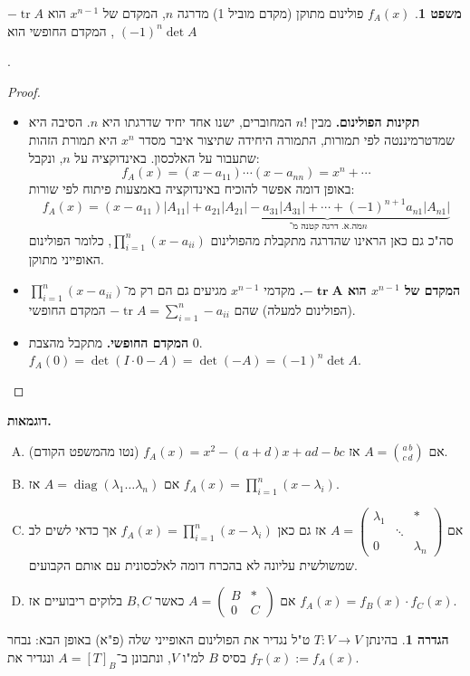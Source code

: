 \documentclass[a4paper]{article}
\DeclareMathOperator{\diag}    {diag}
\DeclareMathOperator{\tr}      {tr}
\newcommand\co        {\colon}
\newcommand\pms[1]    {\begin{pmatrix}
		#1
\end{pmatrix}}
\renewcommand\lg      {\lambda}
\theoremstyle{definition}
\newtheorem{Theorem}{משפט}
\newtheorem{definition}{הגדרה}
\newcommand\theo  [1] {\begin{Theorem}#1\end{Theorem}}
\newcommand\defi  [1] {\begin{definition}#1\end{definition}}
\begin{document}
	\theo{$f_A(x)$ פולינום מתוקן (מקדם מוביל 1) מדרגה $n$, המקדם של $x^{n - 1}$ הוא $-\tr A$, המקדם החופשי הוא $(-1)^{n}\det A$}. 
	
	\begin{proof}\,
		\begin{itemize}
			\item\textbf{ תקינות הפולינום. }מבין $n!$ המחוברים, ישנו אחד יחיד שדרגתו היא $n$. הסיבה היא שמדטרמיננטה לפי תמורות, התמורה היחידה שתיצור איבר מסדר $x^n$ היא תמורת הזהות שתעבור על האלכסון. באינדוקציה על $n$, ונקבל: 
			\[ f_A(x) = (x - a_{11}) \cdots (x - a_{nn}) = x^{n} + \cdots \]
			באופן דומה אפשר להוכיח באינדוקציה באמצעות פיתוח לפי שורות: 
			\[ f_A(x) = (x - a_{11})|A_11| + \underbrace{a_{21}|A_21| - a_{31}|A_31| + \cdots + (-1)^{n + 1}a_{n1}|A_{n1}|}_{\,\!\text{מה.א. דרגה קטנה מ־$n$}} \]
			סה"כ גם כאן הראינו שהדרגה מתקבלת מהפולינום $\prod^{n}_{i = 1}(x - a_{ii})$, כלומר הפולינום האופייני מתוקן. 
			
			\item\textbf{המקדם של $x^{n - 1}$ הוא $\bm{-\tr A}$. } מקדמי $x^{n - 1}$ מגיעים גם הם רק מ־$\prod^{n}_{i = 1}(x - a_{ii})$ (הפולינום למעלה) שהם $-\tr A = \sum_{i = 1}^{n}-a_{ii}$ המקדם החופשי. 
			\item\textbf{המקדם החופשי. }מתקבל מהצבת $0$. $f_A(0) = \det(I \cdot 0 - A) = \det(-A) = (-1)^{n}\det A$. 
		\end{itemize}
	\end{proof}
	
	\textbf{דוגמאות. }\begin{enumerate}[A)]
		\item אם $A = \binom{a \, b}{c \, d}$ אז $f_A(x) = x^{2} - (a + d)x + ad - bc$ (נטו מהמשפט הקודם). 
		\item אם $A = \diag(\lg_1 \dots \lg_n)$ אז $f_A(x) = \prod_{i = 1}^{n}(x - \lg_i)$. 
		\item אם $A = \pms{\lg_1 & & * \\ & \ddots & \\  0 && \lg_n}$ אז גם כאן $f_A(x) = \prod_{i = 1}^{n}(x - \lg_i)$ אך כדאי לשים לב שמשולשית עליונה לא בהכרח דומה לאלכסונית עם אותם הקבועים. 
		\item אם $A = \pms{B & * \\ 0 & C}$ כאשר $B, C$ בלוקים ריבועיים אז $f_A(x) = f_B(x) \cdot f_C(x)$. 
	\end{enumerate}
	
	\defi{בהינתן $T \co V \to V$ ט"ל נגדיר את הפולינום האופייני שלה (פ"א) באופן הבא: נבחר בסיס $B$ למ"ו $V$, ונתבונן ב־$A = [T]_B$ ונגדיר את $f_T(x) := f_A(x)$. }
	
\end{document}
